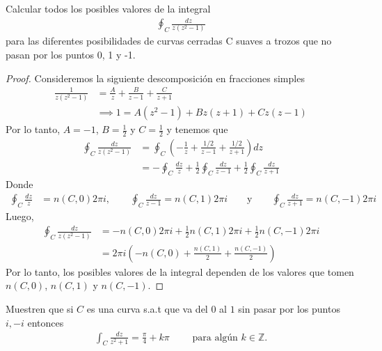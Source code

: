 \documentclass{article}
\newcommand{\Z}{\mathbb{Z}}
\newenvironment{theorem}[2][Ejercicio]{\begin{trivlist}
\item[\hskip\labelsep{\bfseries #1}\hskip\labelsep{\bfseries #2.}]}{\end{trivlist}}
\begin{document}
\vspace{0.25in}

\begin{theorem}{6}
    Calcular todos los posibles valores de la integral \begin{align*}
        \oint_C \frac{dz}{z(z^2 -1)}
    \end{align*}
    para las diferentes posibilidades de curvas cerradas C suaves a trozos que no pasan por los puntos 0, 1 y -1.
\end{theorem}

\begin{proof}
    Consideremos la siguiente descomposición en fracciones simples \begin{align*}
        \frac{1}{z(z^2 - 1)} & = \frac{A}{z} + \frac{B}{z-1} + \frac{C}{z+1}       \\
                             & \implies 1 = A(z^2 - 1) + B z (z + 1) + C z (z - 1)
    \end{align*}
    Por lo tanto, \( A = -1 \), \( B = \frac{1}{2} \) y \( C = \frac{1}{2} \) y tenemos que \begin{align*}
        \oint_C \frac{dz}{z(z^2 - 1)} & = \oint_C \left( -\frac{1}{z} + \frac{1/2}{z-1} + \frac{1/2}{z+1} \right) dz                      \\
                                      & = -\oint_C \frac{dz}{z} + \frac{1}{2} \oint_C \frac{dz}{z-1} + \frac{1}{2} \oint_C \frac{dz}{z+1}
    \end{align*}
    Donde \begin{align*}
        \oint_C \frac{dz}{z} & = n(C, 0) 2\pi i, \qquad \oint_C \frac{dz}{z-1} = n(C, 1) 2\pi i \qquad \text{y} \qquad  \oint_C \frac{dz}{z+1} = n(C, -1) 2\pi i
    \end{align*}
    Luego, \begin{align*}
        \oint_C \frac{dz}{z(z^2 - 1)} & = -n(C, 0) 2\pi i + \frac{1}{2} n(C, 1) 2\pi i + \frac{1}{2} n(C, -1) 2\pi i \\
                                      & = 2\pi i \left( -n(C, 0) + \frac{n(C, 1)}{2} + \frac{n(C, -1)}{2} \right)
    \end{align*}
    Por lo tanto, los posibles valores de la integral dependen de los valores que tomen \( n(C, 0) \), \( n(C, 1) \) y \( n(C, -1) \).
\end{proof}

\clearpage

\begin{theorem}{7}
    Muestren que si \( C \) es una curva s.a.t que va del \( 0 \) al \( 1 \) sin pasar por los puntos \( i, - i\) entonces\begin{align*}
        \int_C \frac{dz}{z^2 + 1} = \frac{\pi}{4} + k \pi \qquad \text{ para algún } k \in \Z.
    \end{align*}
\end{theorem}
\end{document}
